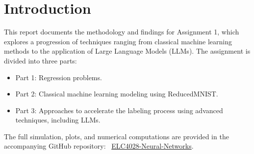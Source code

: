 \section{Introduction}

This report documents the methodology and findings for Assignment 1, which explores a progression of techniques ranging from classical machine learning methods to the application of Large Language Models (LLMs). The assignment is divided into three parts:

\begin{itemize}
    \item Part 1: Regression problems.
    \item Part 2: Classical machine learning modeling using ReducedMNIST\@.
    \item Part 3: Approaches to accelerate the labeling process using advanced techniques, including LLMs.
\end{itemize}

\noindent The full simulation, plots, and numerical computations are provided in the accompanying GitHub repository: \
\href{https://github.com/EriniH/ELC4028-Neural-Networks}{ELC4028-Neural-Networks}.